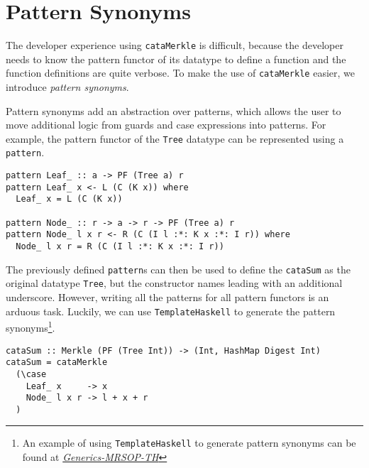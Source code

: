\section{Pattern Synonyms}

The developer experience using \texttt{cataMerkle} is difficult, because the developer needs to know the pattern functor of its datatype to define a function and the function definitions are quite verbose. To make the use of \texttt{cataMerkle} easier, we introduce \textit{pattern synonyms}\cite{pickering2016pattern}. 

Pattern synonyms add an abstraction over patterns, which allows the user to move additional logic from guards and case expressions into patterns. For example, the pattern functor of the \texttt{Tree} datatype can be represented using a \texttt{pattern}.

\begin{verbatim}
pattern Leaf_ :: a -> PF (Tree a) r
pattern Leaf_ x <- L (C (K x)) where
  Leaf_ x = L (C (K x))

pattern Node_ :: r -> a -> r -> PF (Tree a) r
pattern Node_ l x r <- R (C (I l :*: K x :*: I r)) where
  Node_ l x r = R (C (I l :*: K x :*: I r))
\end{verbatim}

The previously defined \texttt{pattern}s can then be used to define the \texttt{cataSum} as the original datatype \texttt{Tree}, but the constructor names leading with an additional underscore. However, writing all the patterns for all pattern functors is an arduous task. Luckily, we can use \texttt{TemplateHaskell} to generate the pattern synonyms\footnote{An example of using \texttt{TemplateHaskell} to generate pattern synonyms can be found at \href{https://hackage.haskell.org/package/generics-mrsop-2.3.0/docs/Generics-MRSOP-TH.html}{\textit{Generics-MRSOP-TH}}}.

\begin{verbatim}
cataSum :: Merkle (PF (Tree Int)) -> (Int, HashMap Digest Int)
cataSum = cataMerkle
  (\case
    Leaf_ x     -> x
    Node_ l x r -> l + x + r
  )
\end{verbatim}